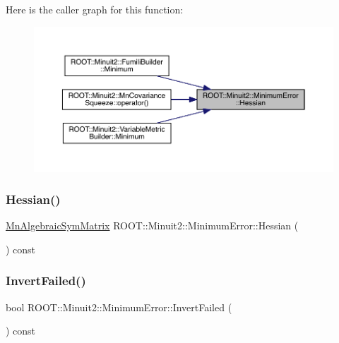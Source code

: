 Here is the caller graph for this function\+:
\nopagebreak
\begin{figure}[H]
\begin{center}
\leavevmode
\includegraphics[width=350pt]{d5/d32/classROOT_1_1Minuit2_1_1MinimumError_a7f591009a8e0d017a77da5efa5f6a7e0_icgraph}
\end{center}
\end{figure}
\mbox{\label{classROOT_1_1Minuit2_1_1MinimumError_a7f591009a8e0d017a77da5efa5f6a7e0}} 
\subsubsection{\texorpdfstring{Hessian()}{Hessian()}\hspace{0.1cm}{\footnotesize\ttfamily [3/3]}}
{\footnotesize\ttfamily \mbox{\hyperlink{namespaceROOT_1_1Minuit2_a9e74ad97f5537a2e80e52b04d98ecc6e}{Mn\+Algebraic\+Sym\+Matrix}} R\+O\+O\+T\+::\+Minuit2\+::\+Minimum\+Error\+::\+Hessian (\begin{DoxyParamCaption}{ }\end{DoxyParamCaption}) const\hspace{0.3cm}{\ttfamily [inline]}}

\mbox{\label{classROOT_1_1Minuit2_1_1MinimumError_ae9f212180703d5504c281f90efee263a}} 
\subsubsection{\texorpdfstring{InvertFailed()}{InvertFailed()}\hspace{0.1cm}{\footnotesize\ttfamily [1/3]}}
{\footnotesize\ttfamily bool R\+O\+O\+T\+::\+Minuit2\+::\+Minimum\+Error\+::\+Invert\+Failed (\begin{DoxyParamCaption}{ }\end{DoxyParamCaption}) const\hspace{0.3cm}{\ttfamily [inline]}}

